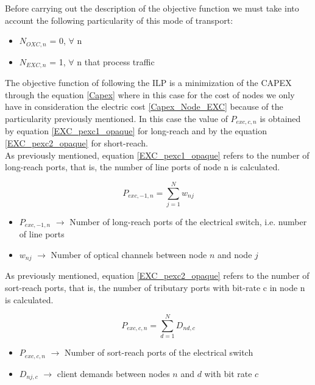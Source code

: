 Before carrying out the description of the objective function we must take into account the following particularity of this mode of transport:
\begin{itemize}
  \item $N_{OXC,n}$ = 0, \quad $\forall$ n
  \item $N_{EXC,n}$ = 1, \quad $\forall$ n that process traffic
\end{itemize}


\vspace{11pt}
The objective function of following the ILP is a minimization of the CAPEX through the equation \ref{Capex} where in this case for the cost of nodes we only have in consideration the electric cost \ref{Capex_Node_EXC} because of the particularity previously mentioned.
In this case the value of $P_{exc,c,n}$ is obtained by equation \ref{EXC_pexc1_opaque} for long-reach and by the equation \ref{EXC_pexc2_opaque} for short-reach.\\

\newpage
As previously mentioned, equation \ref{EXC_pexc1_opaque} refers to the number of long-reach ports, that is, the number of line ports of node n is calculated.

\begin{equation}
P_{exc,-1,n} = \sum_{j=1}^{N} w_{nj}
\label{EXC_pexc1_opaque}
\end{equation}

\begin{itemize}
\item{$P_{exc,-1,n}$	$\rightarrow$	Number of long-reach ports of the electrical switch, i.e. number of line ports}
\item{$w_{nj}$			$\rightarrow$	Number of optical channels between node $n$ and node $j$}
\end{itemize}

\vspace{11pt}
As previously mentioned, equation \ref{EXC_pexc2_opaque} refers to the number of sort-reach ports, that is, the number of tributary ports with bit-rate c in node n is calculated.

\begin{equation}
P_{exc,c,n} = \sum_{d=1}^{N} D_{nd,c}
\label{EXC_pexc2_opaque}
\end{equation}

\begin{itemize}
\item{$P_{exc,c,n}$	$\rightarrow$	Number of sort-reach ports of the electrical switch}
\item{$D_{nj,c}$	$\rightarrow$	client demands between nodes $n$ and $d$ with bit rate $c$}
\end{itemize}

